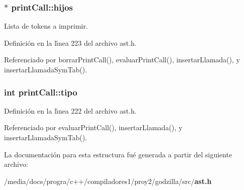\subsubsection{$\ast$ {\bf print\-Call::hijos}}\label{structprintCall_o1}


Lista de tokens a imprimir. 



Definici\'{o}n en la l\'{\i}nea 223 del archivo ast.h.

Referenciado por borrar\-Print\-Call(), evaluar\-Print\-Call(), insertar\-Llamada(), y insertar\-Llamada\-Sym\-Tab().
\subsubsection{\setlength{\rightskip}{0pt plus 5cm}int {\bf print\-Call::tipo}}\label{structprintCall_o0}




Definici\'{o}n en la l\'{\i}nea 222 del archivo ast.h.

Referenciado por evaluar\-Print\-Call(), insertar\-Llamada(), y insertar\-Llamada\-Sym\-Tab().

La documentaci\'{o}n para esta estructura fu\'{e} generada a partir del siguiente archivo:\begin{CompactItemize}
\item 
/media/docs/progra/c++/compiladores1/proy2/godzilla/src/{\bf ast.h}\end{CompactItemize}
